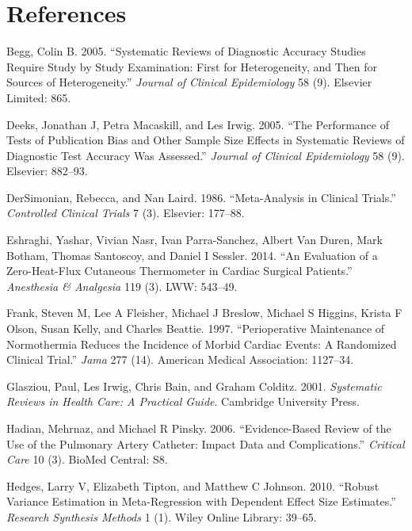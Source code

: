 \documentclass[smallextended]{svjour3}       %
\begin{document}
\hypertarget{references}{%
\section*{References}\label{references}}

\hypertarget{refs}{}
\leavevmode\hypertarget{ref-begg2005systematic}{}%
Begg, Colin B. 2005. ``Systematic Reviews of Diagnostic Accuracy Studies
Require Study by Study Examination: First for Heterogeneity, and Then
for Sources of Heterogeneity.'' \emph{Journal of Clinical Epidemiology}
58 (9). Elsevier Limited: 865.

\leavevmode\hypertarget{ref-deeks2005performance}{}%
Deeks, Jonathan J, Petra Macaskill, and Les Irwig. 2005. ``The
Performance of Tests of Publication Bias and Other Sample Size Effects
in Systematic Reviews of Diagnostic Test Accuracy Was Assessed.''
\emph{Journal of Clinical Epidemiology} 58 (9). Elsevier: 882--93.

\leavevmode\hypertarget{ref-dersimonian1986meta}{}%
DerSimonian, Rebecca, and Nan Laird. 1986. ``Meta-Analysis in Clinical
Trials.'' \emph{Controlled Clinical Trials} 7 (3). Elsevier: 177--88.

\leavevmode\hypertarget{ref-eshraghi2014}{}%
Eshraghi, Yashar, Vivian Nasr, Ivan Parra-Sanchez, Albert Van Duren,
Mark Botham, Thomas Santoscoy, and Daniel I Sessler. 2014. ``An
Evaluation of a Zero-Heat-Flux Cutaneous Thermometer in Cardiac Surgical
Patients.'' \emph{Anesthesia \& Analgesia} 119 (3). LWW: 543--49.

\leavevmode\hypertarget{ref-frank1997perioperative}{}%
Frank, Steven M, Lee A Fleisher, Michael J Breslow, Michael S Higgins,
Krista F Olson, Susan Kelly, and Charles Beattie. 1997. ``Perioperative
Maintenance of Normothermia Reduces the Incidence of Morbid Cardiac
Events: A Randomized Clinical Trial.'' \emph{Jama} 277 (14). American
Medical Association: 1127--34.

\leavevmode\hypertarget{ref-glasziou2001systematic}{}%
Glasziou, Paul, Les Irwig, Chris Bain, and Graham Colditz. 2001.
\emph{Systematic Reviews in Health Care: A Practical Guide}. Cambridge
University Press.

\leavevmode\hypertarget{ref-hadian2006evidence}{}%
Hadian, Mehrnaz, and Michael R Pinsky. 2006. ``Evidence-Based Review of
the Use of the Pulmonary Artery Catheter: Impact Data and
Complications.'' \emph{Critical Care} 10 (3). BioMed Central: S8.

\leavevmode\hypertarget{ref-hedges2010robust}{}%
Hedges, Larry V, Elizabeth Tipton, and Matthew C Johnson. 2010. ``Robust
Variance Estimation in Meta-Regression with Dependent Effect Size
Estimates.'' \emph{Research Synthesis Methods} 1 (1). Wiley Online
Library: 39--65.
\end{document}
